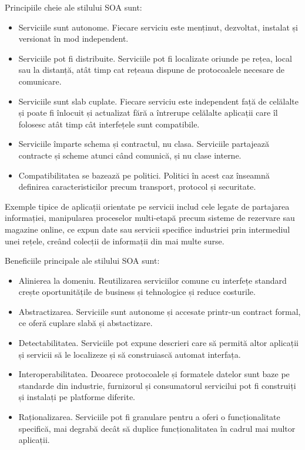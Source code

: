 \documentclass[12pt, a4paper, oneside, romanian]{teza-upb}
\begin{document}
Principiile cheie ale stilului SOA sunt:
\begin{itemize}
 \item Serviciile sunt autonome. Fiecare serviciu este menținut, dezvoltat, instalat și versionat în mod independent.
 \item Serviciile pot fi distribuite. Serviciile pot fi localizate oriunde pe rețea, local sau la distanță, atât timp cat rețeaua dispune de protocoalele necesare de comunicare.
 \item Serviciile sunt slab cuplate. Fiecare serviciu este independent față de celălalte și poate fi înlocuit și actualizat fără a întrerupe celălalte aplicații care îl folosesc atât timp cât interfețele sunt compatibile.
 \item Serviciile împarte schema și contractul, nu clasa. Serviciile partajează contracte și scheme atunci când comunică, și nu clase interne.
 \item Compatibilitatea se bazează pe politici. Politici în acest caz înseamnă definirea caracteristicilor precum transport, protocol și securitate.
\end{itemize}

Exemple tipice de aplicații orientate pe servicii includ cele legate de partajarea informației, manipularea proceselor multi-etapă precum sisteme de rezervare sau magazine online, ce expun date sau servicii specifice industriei prin intermediul unei rețele, creând colecții de informații din mai multe surse.

Beneficiile principale ale stilului SOA sunt:
\begin{itemize}
	\item Alinierea la domeniu. Reutilizarea serviciilor comune cu interfețe standard crește oportunitățile de business și tehnologice și reduce costurile.
	\item Abstractizarea. Serviciile sunt autonome și accesate printr-un contract formal, ce oferă cuplare slabă și abstactizare.
	\item Detectabilitatea. Serviciile pot expune descrieri care să permită altor aplicații și servicii să le localizeze și să construiască automat interfața.
	\item Interoperabilitatea. Deoarece protocoalele și formatele datelor sunt baze pe standarde din industrie, furnizorul și consumatorul servicilui pot fi construiți și instalați pe platforme diferite.
	\item Raționalizarea. Serviciile pot fi granulare pentru a oferi o funcționalitate specifică, mai degrabă decât să duplice funcționalitatea în cadrul mai multor aplicații.
\end{itemize}
\end{document}
